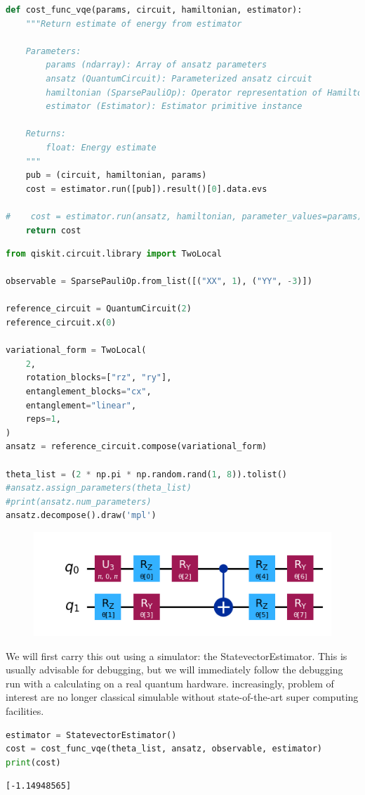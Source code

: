 \documentclass[12pt, oneside]{book}
\theoremstyle{definition}
\theoremstyle{definition}
\theoremstyle{remark}
\begin{document}
\begin{lstlisting}[language=Python]
def cost_func_vqe(params, circuit, hamiltonian, estimator):
    """Return estimate of energy from estimator

    Parameters:
        params (ndarray): Array of ansatz parameters
        ansatz (QuantumCircuit): Parameterized ansatz circuit
        hamiltonian (SparsePauliOp): Operator representation of Hamiltonian
        estimator (Estimator): Estimator primitive instance

    Returns:
        float: Energy estimate
    """
    pub = (circuit, hamiltonian, params)
    cost = estimator.run([pub]).result()[0].data.evs

#    cost = estimator.run(ansatz, hamiltonian, parameter_values=params).result().values[0]
    return cost
\end{lstlisting}
\begin{lstlisting}[language=Python]
from qiskit.circuit.library import TwoLocal

observable = SparsePauliOp.from_list([("XX", 1), ("YY", -3)])

reference_circuit = QuantumCircuit(2)
reference_circuit.x(0)

variational_form = TwoLocal(
    2,
    rotation_blocks=["rz", "ry"],
    entanglement_blocks="cx",
    entanglement="linear",
    reps=1,
)
ansatz = reference_circuit.compose(variational_form)

theta_list = (2 * np.pi * np.random.rand(1, 8)).tolist()
#ansatz.assign_parameters(theta_list)
#print(ansatz.num_parameters)
ansatz.decompose().draw('mpl')
\end{lstlisting}
\begin{figure}[H]
    \centering
    \includegraphics[width=0.5\linewidth]{../images/cost_func_1.png}
\end{figure}

We will first carry this out using a simulator: the StatevectorEstimator. This is usually advisable for debugging, but we will immediately follow the debugging run with a calculating on a real quantum hardware. increasingly, problem of interest are no longer classical simulable without state-of-the-art super computing facilities.

\begin{lstlisting}[language=Python]
estimator = StatevectorEstimator()
cost = cost_func_vqe(theta_list, ansatz, observable, estimator)
print(cost)
\end{lstlisting}
\begin{lstlisting}
[-1.14948565]
\end{lstlisting}
\end{document}

